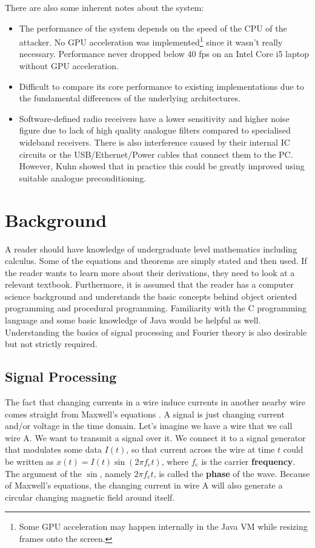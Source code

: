 \documentclass[a4paper,12pt,twoside,openright]{report}
\begin{document}
There are also some inherent notes about the system:
\begin{itemize}

  \item The performance of the system depends on the speed of the CPU of the attacker. No GPU acceleration was implemented\footnote{Some GPU acceleration may happen internally in the Java VM while resizing frames onto the screen.} since it wasn't really necessary. Performance never dropped below 40 fps on an Intel Core i5 laptop without GPU acceleration.
  \item Difficult to compare its core performance to existing implementations due to the fundamental differences of the underlying architectures.
  \item Software-defined radio receivers have a lower sensitivity and higher noise figure due to lack of high quality analogue filters compared to specialised wideband receivers. There is also interference caused by their internal IC circuits or the USB/Ethernet/Power cables that connect them to the PC. However, Kuhn showed that in practice this could be greatly improved using suitable analogue preconditioning.
  
\end{itemize}

\chapter{Background}

A reader should have knowledge of undergraduate level mathematics including calculus. Some of the equations and theorems are simply stated and then used. If the reader wants to learn more about their derivations, they need to look at a relevant textbook. Furthermore, it is assumed that the reader has a computer science background and understands the basic concepts behind object oriented programming and procedural programming. Familiarity with the C programming language and some basic knowledge of Java would be helpful as well. Understanding the basics of signal processing and Fourier theory is also desirable but not strictly required.

\section{Signal Processing} 

The fact that changing currents in a wire induce currents in another nearby wire comes straight from Maxwell's equations \cite{maxwell1881treatise}. A signal is just changing current and/or voltage in the time domain. Let's imagine we have a wire that we call wire A. We want to transmit a signal over it. We connect it to a signal generator that modulates some data $I(t)$, so that current across the wire at time $t$ could be written as $x(t) = I(t) \sin(2\pi f_\text{c} t)$, where $f_\text{c}$ is the carrier \textbf{frequency}. The argument of the $\sin$, namely $2\pi f_\text{c} t$, is called the \textbf{phase} of the wave. Because of Maxwell's equations, the changing current in wire A will also generate a circular changing magnetic field around itself.
\end{document}
